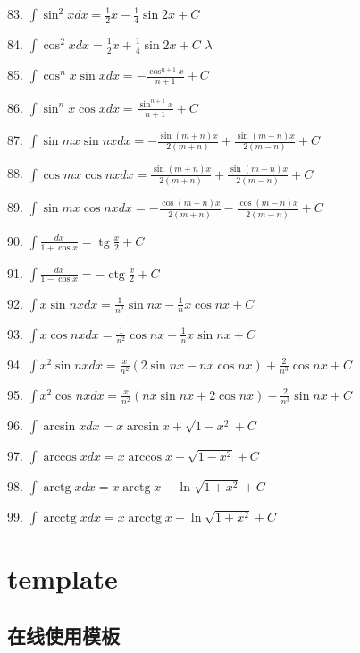 \documentclass[lang=cn,newtx,10pt,scheme=chinese]{elegantbook}
\begin{document}
83. \(\int {\sin }^{2}{xdx} = \frac{1}{2}x - \frac{1}{4}\sin {2x} + C\)

84. \(\int {\cos }^{2}{xdx} = \frac{1}{2}x + \frac{1}{4}\sin {2x} + C\) \(\lambda\)

85. \(\int {\cos }^{n}x\sin {xdx} = - \frac{{\cos }^{n + 1}x}{n + 1} + C\)

86. \(\int {\sin }^{n}x\cos {xdx} = \frac{{\sin }^{n + 1}x}{n + 1} + C\)

87. \(\int \sin {mx}\sin {nxdx} = - \frac{\sin \left( {m + n}\right) x}{2\left( {m + n}\right) } + \frac{\sin \left( {m - n}\right) x}{2\left( {m - n}\right) } + C\)

88. \(\int \cos {mx}\cos {nxdx} = \frac{\sin \left( {m + n}\right) x}{2\left( {m + n}\right) } + \frac{\sin \left( {m - n}\right) x}{2\left( {m - n}\right) } + C\)

89. \(\int \sin {mx}\cos {nxdx} = - \frac{\cos \left( {m + n}\right) x}{2\left( {m + n}\right) } - \frac{\cos \left( {m - n}\right) x}{2\left( {m - n}\right) } + C\)

90. \(\int \frac{dx}{1 + \cos x} = \operatorname{tg}\frac{x}{2} + C\)

91. \(\int \frac{dx}{1 - \cos x} = - \operatorname{ctg}\frac{x}{2} + C\)

92. \(\int x\sin {nxdx} = \frac{1}{{n}^{2}}\sin {nx} - \frac{1}{n}x\cos {nx} + C\)

93. \(\int x\cos {nxdx} = \frac{1}{{n}^{2}}\cos {nx} + \frac{1}{n}x\sin {nx} + C\)

94. \(\int {x}^{2}\sin {nxdx} = \frac{x}{{n}^{2}}\left( {2\sin {nx} - {nx}\cos {nx}}\right) + \frac{2}{{n}^{3}}\cos {nx} + C\)

95. \(\int {x}^{2}\cos {nxdx} = \frac{x}{{n}^{2}}\left( {{nx}\sin {nx} + 2\cos {nx}}\right) - \frac{2}{{n}^{3}}\sin {nx} + C\)

96. \(\int \arcsin {xdx} = x\arcsin x + \sqrt{1 - {x}^{2}} + C\)

97. \(\int \arccos {xdx} = x\arccos x - \sqrt{1 - {x}^{2}} + C\)

98. \(\int \operatorname{arctg}{xdx} = x\operatorname{arctg}x - \ln \sqrt{1 + {x}^{2}} + C\)

99. \(\int \operatorname{arcctg}{xdx} = x\operatorname{arcctg}x + \ln \sqrt{1 + {x}^{2}} + C\)

\chapter{template}

\section {在线使用模板}
\end{document}
